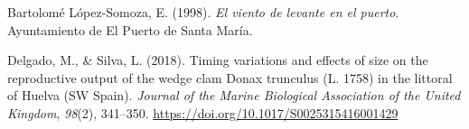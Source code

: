 \documentclass[
]{article}
\newlength{\cslhangindent}
\newenvironment{CSLReferences}[2] %
 {\begin{list}{}{%
  \setlength{\itemindent}{0pt}
  \setlength{\leftmargin}{0pt}
  \setlength{\parsep}{0pt}
  \ifodd #1
   \setlength{\leftmargin}{\cslhangindent}
   \setlength{\itemindent}{-1\cslhangindent}
  \fi
  \setlength{\itemsep}{#2\baselineskip}}}
 {\end{list}}
\begin{document}
\label{refs}
\begin{CSLReferences}{1}{0}
Bartolomé López-Somoza, E. (1998). \emph{El viento de levante en el puerto}. Ayuntamiento de El Puerto de Santa María.

Delgado, M., \& Silva, L. (2018). {Timing variations and effects of size on the reproductive output of the wedge clam Donax trunculus (L. 1758) in the littoral of Huelva (SW Spain)}. \emph{Journal of the Marine Biological Association of the United Kingdom}, \emph{98}(2), 341--350. \url{https://doi.org/10.1017/S0025315416001429}

\end{CSLReferences}
\end{document}
